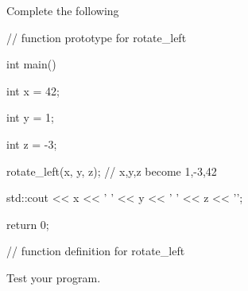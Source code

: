 Complete the following



\begin{consolethree}[escapeinside=||]

// function prototype for rotate_left



int main()

{

    int x = 42;

    int y = 1;

    int z = -3;

    rotate_left(x, y, z); // x,y,z become 1,-3,42

    std::cout << x << ' ' << y << ' ' << z << '\n';

    return 0;

}



// function definition for rotate_left

\end{consolethree}



Test your program.

